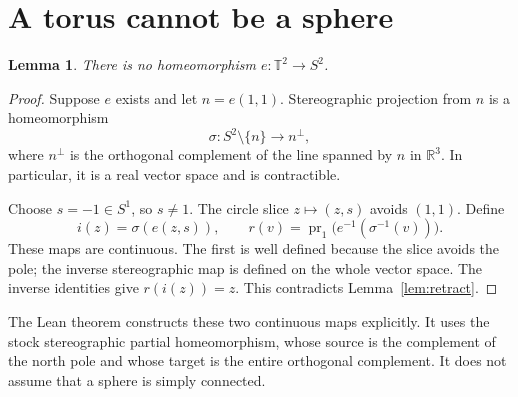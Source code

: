 \documentclass[11pt]{article}
\newtheorem{lemma}[theorem]{Lemma}
\newcommand{\R}{\mathbb R}
\newcommand{\T}{\mathbb T}
\begin{document}
\section{A torus cannot be a sphere}
\begin{lemma}\label{lem:torussphere}
There is no homeomorphism $e:\T^2\to S^2$.
\end{lemma}
\begin{proof}
Suppose $e$ exists and let $n=e(1,1)$. Stereographic projection from $n$ is a homeomorphism
\[
 \sigma:S^2\setminus\{n\}\longrightarrow n^\perp,
\]
where $n^\perp$ is the orthogonal complement of the line spanned by $n$ in $\R^3$. In particular, it is a real vector space and is contractible.

Choose $s=-1\in S^1$, so $s\ne1$. The circle slice $z\mapsto(z,s)$ avoids $(1,1)$. Define
\[
 i(z)=\sigma(e(z,s)),\qquad
 r(v)=\operatorname{pr}_1\bigl(e^{-1}(\sigma^{-1}(v))\bigr).
\]
These maps are continuous. The first is well defined because the slice avoids the pole; the inverse stereographic map is defined on the whole vector space. The inverse identities give $r(i(z))=z$. This contradicts Lemma~\ref{lem:retract}.
\end{proof}

The Lean theorem constructs these two continuous maps explicitly. It uses the stock stereographic partial homeomorphism, whose source is the complement of the north pole and whose target is the entire orthogonal complement. It does not assume that a sphere is simply connected.
\end{document}
